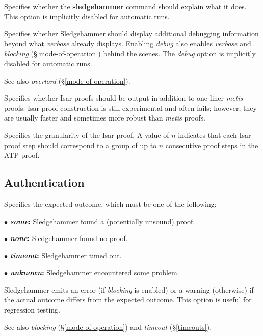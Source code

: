 \documentclass[a4paper,12pt]{article}
\begin{document}
\begin{enum}

Specifies whether the \textbf{sledgehammer} command should explain what it does.
This option is implicitly disabled for automatic runs.

Specifies whether Sledgehammer should display additional debugging information
beyond what \textit{verbose} already displays. Enabling \textit{debug} also
enables \textit{verbose} and \textit{blocking} (\S\ref{mode-of-operation})
behind the scenes. The \textit{debug} option is implicitly disabled for
automatic runs.

\nopagebreak
{\small See also \textit{overlord} (\S\ref{mode-of-operation}).}

Specifies whether Isar proofs should be output in addition to one-liner
\textit{metis} proofs. Isar proof construction is still experimental and often
fails; however, they are usually faster and sometimes more robust than
\textit{metis} proofs.

Specifies the granularity of the Isar proof. A value of $n$ indicates that each
Isar proof step should correspond to a group of up to $n$ consecutive proof
steps in the ATP proof.
\end{enum}

\subsection{Authentication}
\label{authentication}

\begin{enum}
Specifies the expected outcome, which must be one of the following:

\begin{enum}
\item[$\bullet$] \textbf{\textit{some}:} Sledgehammer found a (potentially
unsound) proof.
\item[$\bullet$] \textbf{\textit{none}:} Sledgehammer found no proof.
\item[$\bullet$] \textbf{\textit{timeout}:} Sledgehammer timed out.
\item[$\bullet$] \textbf{\textit{unknown}:} Sledgehammer encountered some
problem.
\end{enum}

Sledgehammer emits an error (if \textit{blocking} is enabled) or a warning
(otherwise) if the actual outcome differs from the expected outcome. This option
is useful for regression testing.

\nopagebreak
{\small See also \textit{blocking} (\S\ref{mode-of-operation}) and
\textit{timeout} (\S\ref{timeouts}).}
\end{enum}
\end{document}
